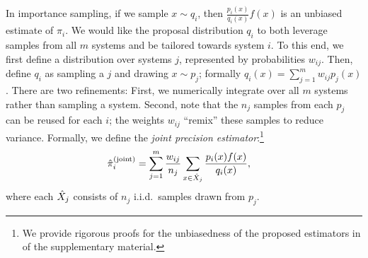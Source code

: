 In importance sampling, if we sample $x \sim q_i$, then $\frac{p_i(x)}{q_i(x)} f(x)$ is an unbiased estimate of $\pi_i$.
We would like the proposal distribution $q_i$ to both leverage samples from all $m$ systems and be tailored towards system $i$.
To this end, we first define a distribution over systems $j$, represented by probabilities $w_{ij}$.
Then, define $q_i$ as sampling a $j$ and drawing $x \sim p_j$;
formally $q_i(x) = \sum_{j=1}^m w_{ij} p_j(x)$.
There are two refinements:
First, we numerically integrate over all $m$ systems rather than sampling a system.
Second, note that the $n_j$ samples from each $p_j$ can be reused for each $i$;
the weights $w_{ij}$ ``remix'' these samples to reduce variance.
Formally, we define the \emph{joint precision estimator}:\footnote{We provide rigorous proofs for the
unbiasedness of the proposed estimators in  of the
supplementary material.}
\begin{align}
  {\hat{\pi}}_i^{\text{(joint)}} &= \sum_{j=1}^m \frac{w_{ij}}{n_{j}} \sum_{x \in {\hat{X}}_j} \frac{p_i(x) f(x)}{q_i(x)},
\end{align}
where each ${\hat{X}}_j$ consists of $n_j$ i.i.d.~samples drawn from $p_j$.



